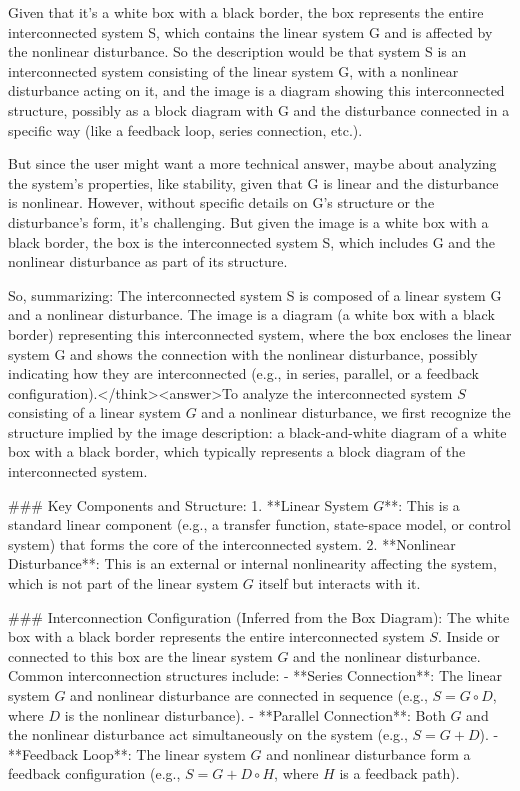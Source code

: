 Given that it's a white box with a black border, the box represents the entire interconnected system S, which contains the linear system G and is affected by the nonlinear disturbance. So the description would be that system S is an interconnected system consisting of the linear system G, with a nonlinear disturbance acting on it, and the image is a diagram showing this interconnected structure, possibly as a block diagram with G and the disturbance connected in a specific way (like a feedback loop, series connection, etc.). 

But since the user might want a more technical answer, maybe about analyzing the system's properties, like stability, given that G is linear and the disturbance is nonlinear. However, without specific details on G's structure or the disturbance's form, it's challenging. But given the image is a white box with a black border, the box is the interconnected system S, which includes G and the nonlinear disturbance as part of its structure. 

So, summarizing: The interconnected system S is composed of a linear system G and a nonlinear disturbance. The image is a diagram (a white box with a black border) representing this interconnected system, where the box encloses the linear system G and shows the connection with the nonlinear disturbance, possibly indicating how they are interconnected (e.g., in series, parallel, or a feedback configuration).</think><answer>To analyze the interconnected system \( S \) consisting of a linear system \( G \) and a nonlinear disturbance, we first recognize the structure implied by the image description: a black-and-white diagram of a white box with a black border, which typically represents a block diagram of the interconnected system.  

### Key Components and Structure:  
1. **Linear System \( G \)**: This is a standard linear component (e.g., a transfer function, state-space model, or control system) that forms the core of the interconnected system.  
2. **Nonlinear Disturbance**: This is an external or internal nonlinearity affecting the system, which is not part of the linear system \( G \) itself but interacts with it.  

### Interconnection Configuration (Inferred from the Box Diagram):  
The white box with a black border represents the entire interconnected system \( S \). Inside or connected to this box are the linear system \( G \) and the nonlinear disturbance. Common interconnection structures include:  
- **Series Connection**: The linear system \( G \) and nonlinear disturbance are connected in sequence (e.g., \( S = G \circ D \), where \( D \) is the nonlinear disturbance).  
- **Parallel Connection**: Both \( G \) and the nonlinear disturbance act simultaneously on the system (e.g., \( S = G + D \)).  
- **Feedback Loop**: The linear system \( G \) and nonlinear disturbance form a feedback configuration (e.g., \( S = G + D \circ H \), where \( H \) is a feedback path).  

